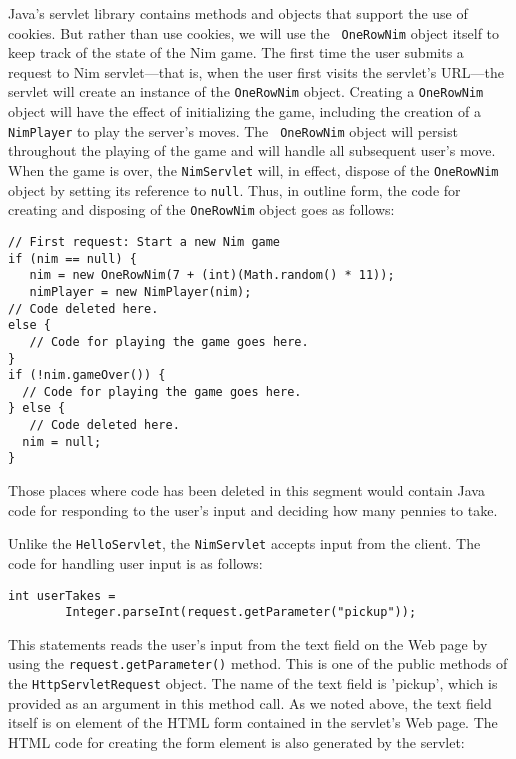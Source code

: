 {{{{Java's servlet library contains methods and objects that support the
use of cookies. But rather than use cookies, we will use the {\tt
OneRowNim} object itself to keep track of the state of the Nim game.
The first time the user submits a request to Nim servlet---that is,
when the user first visits the servlet's URL---the servlet will create
an instance of the {\tt OneRowNim} object. Creating a {\tt OneRowNim}
object will have the effect of initializing the game, including the
creation of a {\tt NimPlayer} to play the server's moves.  The {\tt
OneRowNim} object will persist throughout the playing of the game and
will handle all subsequent user's move. When the game is over, the
{\tt NimServlet} will, in effect, dispose of the {\tt OneRowNim}
object by setting its reference to {\tt null}.  Thus, in outline
form, the code for creating and disposing of the {\tt OneRowNim}
object goes as follows:

\begin{jjjlisting}
\begin{lstlisting}
// First request: Start a new Nim game
if (nim == null) { 
   nim = new OneRowNim(7 + (int)(Math.random() * 11));
   nimPlayer = new NimPlayer(nim);
// Code deleted here.
else {
   // Code for playing the game goes here.
}
if (!nim.gameOver()) {
  // Code for playing the game goes here.
} else {
   // Code deleted here.
  nim = null;
}
\end{lstlisting}
\end{jjjlisting}

\noindent Those places where code has been deleted in this segment
would contain Java code for responding to the user's input and
deciding how many pennies to take. 

Unlike the {\tt HelloServlet}, the {\tt NimServlet} accepts input from
the client.  The code for handling user input is as follows:

\begin{jjjlisting}
\begin{lstlisting}
int userTakes = 
        Integer.parseInt(request.getParameter("pickup"));
\end{lstlisting}
\end{jjjlisting}

\noindent This statements reads the user's input from the text field
on the Web page by using the {\tt request.getParameter()} method.
This is one of the public methods of the {\tt HttpServletRequest}
object.  The name of the text field is 'pickup', which is provided as
an argument in this method call.  As we noted above, the text field
itself is on element of the HTML form contained in the servlet's
Web page. The HTML code for creating the form element is also generated
by the servlet:

}}}}

